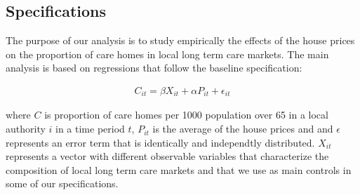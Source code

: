 \documentclass[12pt,letterpaper]{article}
\begin{document}
\title{}


\date{}
 \maketitle
%
%
%
%




\subsection*{Specifications}



The purpose of our analysis is to study empirically the effects of the house prices on the proportion of care homes in local
  long term care markets. The main analysis is based on regressions that follow the baseline 
specification:
 
 \begin{eqnarray}
\label{equation: carehomes_prices}
      C_{it} =\beta X_{it} + \alpha P_{it} + \epsilon_{it}
 \end{eqnarray}

 where $C$ is proportion of care homes per 1000 population over 65 in a local authority $i$ in a time period $t$,
  $P_{it}$ is the average of the house prices and 
 and $\epsilon$ represents an error term that is identically and independtly distributed.  $X_{it}$
  represents a vector with different observable variables
 that characterize the composition of local long term care markets and that we use as main controls in some 
 of our specifications. 
 
\end{document}
